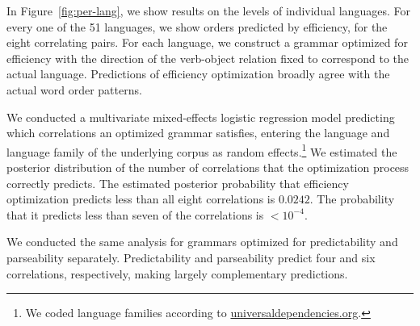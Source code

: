 \documentclass[9pt,twocolumn,twoside,lineno]{pnas-new}
\begin{document}
In Figure~\ref{fig:per-lang}, we show results on the levels of individual languages.
For every one of the 51 languages, we show orders predicted by efficiency, for the eight correlating pairs.
For each language, we construct a grammar optimized for efficiency with the direction of the verb-object relation fixed to correspond to the actual language.
Predictions of efficiency optimization broadly agree with the actual word order patterns.

We conducted a multivariate mixed-effects logistic regression model predicting which correlations an optimized grammar satisfies, entering the language and language family of the underlying corpus as random effects.\footnote{We coded language families according to \url{universaldependencies.org}.}
We estimated the posterior distribution of the number of correlations that the optimization process correctly predicts.
The estimated posterior probability that efficiency optimization predicts less than all eight correlations is $0.0242$. The probability that it predicts less than seven of the correlations is $<10^{-4}$.

We conducted the same analysis for grammars optimized for predictability and parseability separately.
Predictability and parseability predict four and six correlations, respectively, making largely complementary predictions.
\end{document}
